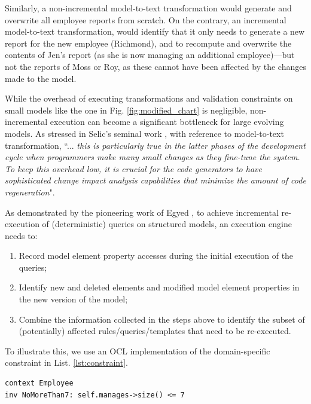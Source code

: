 \documentclass[conference]{IEEEtran}
\begin{document}
Similarly, a non-incremental model-to-text transformation would generate and overwrite all employee reports from scratch. On the contrary, an incremental model-to-text transformation, would identify that it only needs to generate a new report for the new employee (Richmond), and to recompute and overwrite the contents of Jen's report (as she is now managing an additional employee)---but not the reports of Moss or Roy, as these cannot have been affected by the changes made to the model.

While the overhead of executing transformations and validation constraints on small models like the one in Fig. \ref{fig:modified_chart} is negligible, non-incremental execution can become a significant bottleneck for large evolving models. As stressed in Selic's seminal work \cite{selic2003pragmatics}, with reference to model-to-text transformation, ``... \emph{this is particularly true in the latter phases of the development cycle when programmers make many small changes as they fine-tune the system. To keep this overhead low, it is crucial for the code generators to have sophisticated change impact analysis capabilities that minimize the amount of code regeneration}".

As demonstrated by the pioneering work of Egyed \cite{egyed2011automatically}, to achieve incremental re-execution of (deterministic) queries on structured models, an execution engine needs to:

\begin{enumerate}
\item Record model element property accesses during the initial execution of the queries;
\item Identify new and deleted elements and modified model element properties in the new version of the model;
\item Combine the information collected in the steps above to identify the subset of (potentially) affected rules/queries/templates that need to be re-executed.
\end{enumerate}

To illustrate this, we use an OCL implementation of the domain-specific constraint in List. \ref{lst:constraint}.

\begin{lstlisting}[style=ocl,caption={OCL constraint requiring that no employee directly manages more than 7 other employees.},label=lst:constraint]
context Employee
inv NoMoreThan7: self.manages->size() <= 7
\end{lstlisting}
\end{document}
